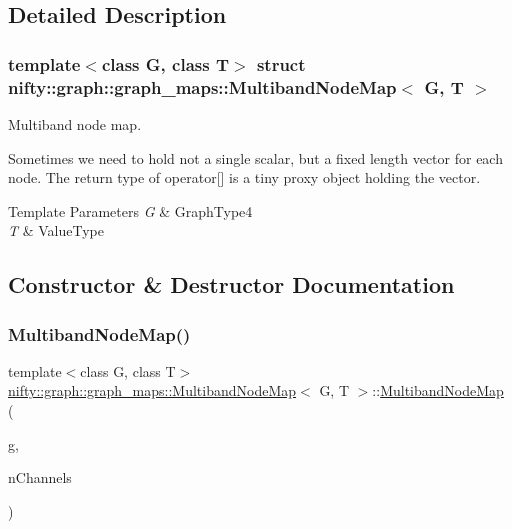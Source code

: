 \subsection{Detailed Description}
\subsubsection*{template$<$class G, class T$>$\newline
struct nifty\+::graph\+::graph\+\_\+maps\+::\+Multiband\+Node\+Map$<$ G, T $>$}

Multiband node map. 

Sometimes we need to hold not a single scalar, but a fixed length vector for each node. The return type of operator\mbox{[}\mbox{]} is a tiny proxy object holding the vector.


\begin{DoxyTemplParams}{Template Parameters}
{\em G} & Graph\+Type4 \\
\hline
{\em T} & Value\+Type \\
\hline
\end{DoxyTemplParams}


\subsection{Constructor \& Destructor Documentation}
\mbox{\label{structnifty_1_1graph_1_1graph__maps_1_1MultibandNodeMap_ab532c7c22bab384004e75c21960f070f}} 
\subsubsection{\texorpdfstring{Multiband\+Node\+Map()}{MultibandNodeMap()}\hspace{0.1cm}{\footnotesize\ttfamily [1/2]}}
{\footnotesize\ttfamily template$<$class G, class T$>$ \\
\hyperlink{structnifty_1_1graph_1_1graph__maps_1_1MultibandNodeMap}{nifty\+::graph\+::graph\+\_\+maps\+::\+Multiband\+Node\+Map}$<$ G, T $>$\+::\hyperlink{structnifty_1_1graph_1_1graph__maps_1_1MultibandNodeMap}{Multiband\+Node\+Map} (\begin{DoxyParamCaption}\item[{const G \&}]{g,  }\item[{const size\+\_\+t}]{n\+Channels }\end{DoxyParamCaption})\hspace{0.3cm}{\ttfamily [inline]}}

